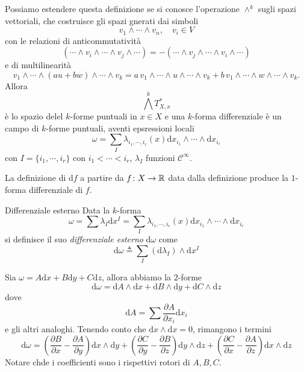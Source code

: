 \documentclass[a4paper]{article}
\begin{document}
Possiamo estendere questa definizione se si conosce l'operazione \(\wedge^k\)
sugli spazi vettoriali,
che costruisce gli spazi gnerati dai simboli
\[
    v_1 \wedge \cdots \wedge v_n, \quad v_i \in V
\]
con le relazioni di anticommutatività
\[
    (\cdots \wedge v_i \wedge \cdots \wedge v_j \wedge \cdots)
    =
    -(\cdots \wedge v_j \wedge \cdots \wedge v_i \wedge \cdots)
\]
e di multilinearità
\[
    v_1 \wedge \cdots \wedge (a u + b w) \wedge \cdots \wedge v_k
    =
    a\, v_1 \wedge \cdots \wedge u \wedge \cdots \wedge v_k
    +
    b\, v_1 \wedge \cdots \wedge w \wedge \cdots \wedge v_k.
\]
Allora \[
    \bigwedge^k T_{X,x}^*
\]
è lo spazio delel \(k\)-forme puntuali in \(x \in X\)
e una \(k\)-forma differenziale è un campo di \(k\)-forme
puntuali, aventi epsressioni locali
\[
    \omega = \sum_{I} \lambda_{i_1, \cdots, i_r}(x)
    \text{d}x_{i_1} \wedge \cdots \wedge \text{d}x_{i_r}
\]
con \(I = \{i_1, \cdots, i_r\}\)
con \(i_1 < \cdots < i_r\), \(\lambda_I\) funzioni \(\mathcal C^\infty\).

\begin{snippetnote}{}
    La definizione di \(\text{d}f\) a partire da
    \(f \colon X \to \mathbb{R}\) data dalla definizione produce la \(1\)-forma differenziale
    di \(f\).
\end{snippetnote}

\begin{snippetdefinition}{Differenziale esterno}
    Data la \(k\)-forma \[
        \omega = \sum \lambda_I \text{d}x^I
        = \sum_{I} \lambda_{i_1, \cdots, i_r}(x)
        \text{d}x_{i_1} \wedge \cdots \wedge \text{d}x_{i_r}
    \]
    si definisce il suo \emph{differenziale esterno}
    \(\text{d} \omega\) come
    \[
        \text{d}\omega \triangleq \sum_I \left(
            \text{d} \lambda_I
        \right) \wedge \text{d}x^I
    \]
\end{snippetdefinition}

\begin{snippetexample}{}
    Sia \(\omega = A\text{d}x + B\text{d}y + C\text{d}z\), allora abbiamo la \(2\)-forme
    \[
        \text{d}\omega = \text{d}A \wedge \text{d}x
        + \text{d}B \wedge \text{d}y
        + \text{d}C \wedge \text{d}z
    \]
    dove
    \[
        \text{d}A = \sum \frac{\partial A}{\partial x_i}\text{d}x_i
    \]
    e gli altri analoghi.
    Tenendo conto che \(\text{d}x \wedge \text{d}x = 0\), rimangono i termini
    \[
        \text{d}\omega = \left(
            \frac{\partial B}{\partial x}
            - \frac{\partial A}{\partial y}
        \right)\text{d}x \wedge \text{d}y
        + \left(
            \frac{\partial C}{\partial y}
            - \frac{\partial B}{\partial z}
        \right)\text{d}y \wedge \text{d}z
        + \left(
            \frac{\partial C}{\partial x}
            - \frac{\partial A}{\partial z}
        \right)\text{d}x \wedge \text{d}z
    \]
    Notare chde i coefficienti sono i rispettivi rotori di \(A,B,C\).
\end{snippetexample}
\end{document}
